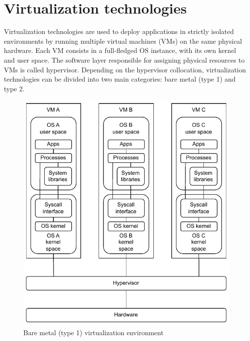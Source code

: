 \section{Virtualization technologies}
Virtualization technologies are used to deploy applications in strictly isolated environments by running multiple virtual machines (VMs) on the same physical hardware.
Each VM consists in a full-fledged OS instance, with its own kernel and user space.
The software layer responsible for assigning physical resources to VMs is called hypervisor.
Depending on the hypervisor collocation, virtualization technologies can be divided into two main categories: bare metal (type 1) and type 2. 

\begin{figure}[htbp]
    \centering
    \includegraphics{assets/type_1_virtualization.pdf}
    \caption{Bare metal (type 1) virtualization environment}
    \label{fig:bare_metal_virtualization}
\end{figure}

